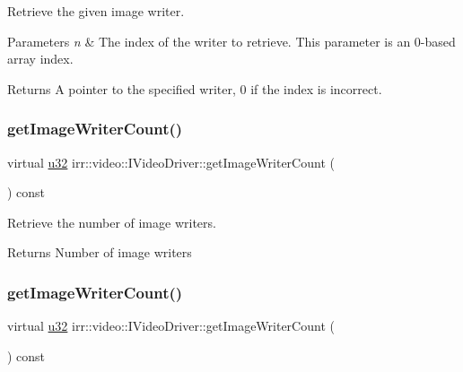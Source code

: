 Retrieve the given image writer. 


\begin{DoxyParams}{Parameters}
{\em n} & The index of the writer to retrieve. This parameter is an 0-\/based array index. \\
\hline
\end{DoxyParams}
\begin{DoxyReturn}{Returns}
A pointer to the specified writer, 0 if the index is incorrect. 
\end{DoxyReturn}
\mbox{\label{classirr_1_1video_1_1IVideoDriver_a173f33f0537a1511abdf35ed235a683a}} 
\subsubsection{\texorpdfstring{get\+Image\+Writer\+Count()}{getImageWriterCount()}\hspace{0.1cm}{\footnotesize\ttfamily [1/2]}}
{\footnotesize\ttfamily virtual \hyperlink{namespaceirr_a0416a53257075833e7002efd0a18e804}{u32} irr\+::video\+::\+I\+Video\+Driver\+::get\+Image\+Writer\+Count (\begin{DoxyParamCaption}{ }\end{DoxyParamCaption}) const\hspace{0.3cm}{\ttfamily [pure virtual]}}



Retrieve the number of image writers. 

\begin{DoxyReturn}{Returns}
Number of image writers 
\end{DoxyReturn}
\mbox{\label{classirr_1_1video_1_1IVideoDriver_a173f33f0537a1511abdf35ed235a683a}} 
\subsubsection{\texorpdfstring{get\+Image\+Writer\+Count()}{getImageWriterCount()}\hspace{0.1cm}{\footnotesize\ttfamily [2/2]}}
{\footnotesize\ttfamily virtual \hyperlink{namespaceirr_a0416a53257075833e7002efd0a18e804}{u32} irr\+::video\+::\+I\+Video\+Driver\+::get\+Image\+Writer\+Count (\begin{DoxyParamCaption}{ }\end{DoxyParamCaption}) const\hspace{0.3cm}{\ttfamily [pure virtual]}}



